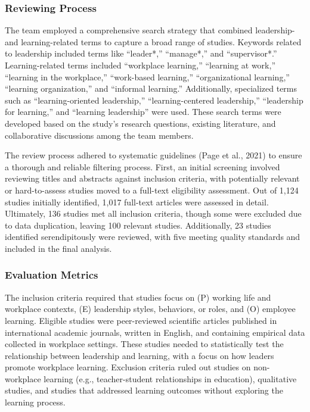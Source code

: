 \subsubsection{Reviewing Process}
The team employed a comprehensive search strategy that combined leadership- and learning-related
terms to capture a broad range of studies. Keywords related to leadership included terms like
“leader*,” “manage*,” and “supervisor*.” Learning-related terms included “workplace learning,”
“learning at work,” “learning in the workplace,” “work-based learning,” “organizational learning,”
“learning organization,” and “informal learning.” Additionally, specialized terms such as
“learning-oriented leadership,” “learning-centered leadership,” “leadership for learning,” and
“learning leadership” were used. These search terms were developed based on the study’s research
questions, existing literature, and collaborative discussions among the team members.

The review process adhered to systematic guidelines (Page et al., 2021) to ensure a thorough and
reliable filtering process. First, an initial screening involved reviewing titles and abstracts
against inclusion criteria, with potentially relevant or hard-to-assess studies moved to a full-text
eligibility assessment. Out of 1,124 studies initially identified, 1,017 full-text articles were
assessed in detail. Ultimately, 136 studies met all inclusion criteria, though some were excluded
due to data duplication, leaving 100 relevant studies. Additionally, 23 studies identified
serendipitously were reviewed, with five meeting quality standards and included in the final
analysis.

\subsubsection{Evaluation Metrics}
The inclusion criteria required that studies focus on (P) working life and workplace contexts, (E)
leadership styles, behaviors, or roles, and (O) employee learning. Eligible studies were
peer-reviewed scientific articles published in international academic journals, written in English,
and containing empirical data collected in workplace settings. These studies needed to statistically
test the relationship between leadership and learning, with a focus on how leaders promote workplace
learning. Exclusion criteria ruled out studies on non-workplace learning (e.g., teacher-student
relationships in education), qualitative studies, and studies that addressed learning outcomes
without exploring the learning process.


